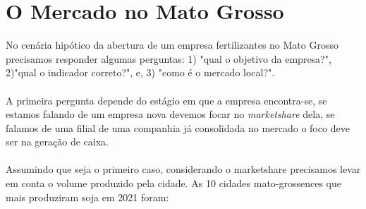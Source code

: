 \documentclass{article}
\begin{document}
\section*{O Mercado no Mato Grosso}
No cenária hipótico da abertura de um empresa fertilizantes no Mato Grosso precisamos responder algumas perguntas: 1) "qual o objetivo da empresa?", 2)"qual o indicador correto?", e, 3) "como é o mercado local?".
\\~\\
A primeira pergunta depende do estágio em que a empresa encontra-se, se estamos falando de um empresa nova devemos focar no \textit{marketshare} dela, se falamos de uma filial de uma companhia já consolidada no mercado o foco deve ser na geração de caixa.
\\~\\
Assumindo que seja o primeiro caso, considerando o marketshare precisamos levar em conta o volume produzido pela cidade. As 10 cidades mato-grossences que mais produziram soja em 2021 foram:
\\
\end{document}
